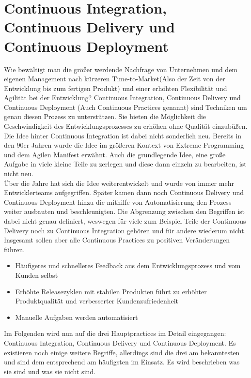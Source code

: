 \section{Continuous Integration, Continuous Delivery und Continuous Deployment}
Wie bewältigt man die größer werdende Nachfrage von Unternehmen und dem eigenen Management nach kürzeren Time-to-Market(Also der Zeit von der Entwicklung bis zum fertigen Produkt) und einer erhöhten Flexibilität und Agilität bei der Entwicklung?\autocite{Capgemini.2017} Continuous Integration, Continuous Delivery und Continuous Deployment (Auch Continuous Practices genannt) sind Techniken um genau diesen Prozess zu unterstützen.  Sie bieten die Möglichkeit die Geschwindigkeit des Entwicklungsprozesses zu erhöhen ohne Qualität einzubüßen.\autocite[Vgl.][S.2]{Shahin.2017}
Die Idee hinter Continuous Integration ist dabei nicht sonderlich neu. Bereits in den 90er Jahren wurde die Idee im größeren Kontext von Extreme Programming und dem Agilen Manifest erwähnt.\autocite[Vgl.][S.2]{Stahl.2018} Auch die grundlegende Idee, eine große Aufgabe in viele kleine Teile zu zerlegen und diese dann einzeln zu bearbeiten, ist nicht neu.\\ Über die Jahre hat sich die Idee weiterentwickelt und wurde von immer mehr Entwicklerteams aufgegriffen. Später kamen dann noch Continuous Delivery und Continuous Deployment hinzu die mithilfe von Automatisierung den Prozess weiter ausbauten und beschleunigten. Die Abgrenzung zwischen den Begriffen ist dabei nicht genau definiert, weswegen für viele zum Beispiel Teile der Continuous Delivery noch zu Continuous Integration gehören und für andere wiederum nicht. Insgesamt sollen aber alle Continuous Practices zu positiven Veränderungen führen.\autocite[Vgl.][S.2]{Shahin.2017}
\begin{itemize}
	\item Häufigeres und schnelleres Feedback aus dem Entwicklungsprozess und vom Kunden selbst 
	\item Erhöhte Releasezyklen mit stabilen Produkten führt zu erhöhter Produktqualität und verbesserter Kundenzufriedenheit
	\item Manuelle Aufgaben werden automatisiert
\end{itemize}
Im Folgenden wird nun auf die drei Hauptpractices im Detail eingegangen: Continuous Integration, Continuous Delivery und Continuous Deployment. Es existieren noch einige weitere Begriffe, allerdings sind die drei am bekanntesten und sind dem entsprechend am häufigsten im Einsatz. Es wird beschrieben was sie sind und was sie nicht sind. 
